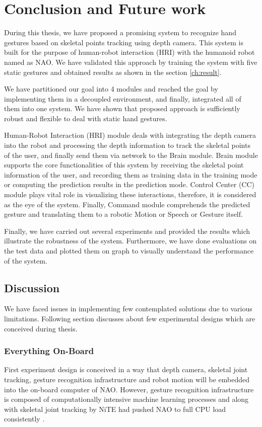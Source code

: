 \chapter{Conclusion and Future work} During this thesis, we have proposed a promising system to recognize hand gestures based on skeletal points tracking using depth camera. This system is built for the purpose of human-robot interaction (HRI) with the humanoid robot named as NAO. We have validated this approach by training the system with five static gestures and obtained results as shown in the section \ref{ch:result}.

We have partitioned our goal into 4 modules and reached the goal by implementing them in a decoupled environment, and finally, integrated all of them into one system. We have shown that proposed approach is sufficiently robust and flexible to deal with static hand gestures. 

Human-Robot Interaction (HRI) module deals with integrating the depth camera into the robot and processing the depth information to track the skeletal points of the user, and finally send them via network to the Brain module. Brain module supports the core functionalities of this system by receiving the skeletal point information of the user, and recording them as training data in the training mode or computing the prediction results in the prediction mode. Control Center (CC) module plays vital role in visualizing these interactions, therefore, it is considered as the eye of the system. Finally, Command module comprehends the predicted gesture and translating them to a robotic Motion or Speech or Gesture itself.

Finally, we have carried out several experiments and provided the results which illustrate the robustness of the system. Furthermore, we have done evaluations on the test data and plotted them on graph to visually understand the performance of the system. 

\section{Discussion} 
We have faced issues in implementing few contemplated solutions due to various limitations. Following section discusses about few experimental designs which are conceived during thesis.

\subsection*{Everything On-Board} First experiment design is conceived in a way that depth camera, skeletal joint tracking, gesture recognition infrastructure and robot motion will be embedded into the on-board computer of NAO. However, gesture recognition infrastructure is composed of computationally intensive machine learning processes and along with skeletal joint tracking by NiTE had pushed NAO to full CPU load consistently \cite{17}.


